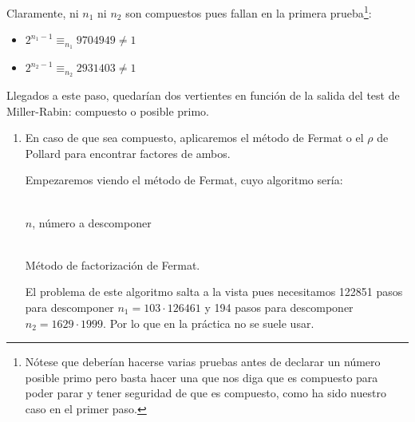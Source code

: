 \begin{enumerate}
		Claramente, ni $n_1$ ni $n_2$ son compuestos pues fallan en la primera prueba\footnote{Nótese que deberían
		hacerse varias pruebas antes de declarar un número posible primo pero basta hacer una que nos diga que es
		compuesto para poder parar y tener seguridad de que es compuesto, como ha sido nuestro caso en el primer
		paso.}:
		\begin{itemize}
			\item $2^{n_1-1} \equiv_{n_1} 9704949 \neq 1$
			\item $2^{n_2-1} \equiv_{n_2} 2931403 \neq 1$
		\end{itemize}
		
		Llegados a este paso, quedarían dos vertientes en función de la salida del test de Miller-Rabin: compuesto
		o posible primo.
		
		\begin{enumerate}
			\item En caso de que sea compuesto, aplicaremos el método de Fermat o el $\rho$ de Pollard para
			encontrar factores de ambos.
			
			Empezaremos viendo el método de Fermat, cuyo algoritmo sería:
			\begin{algorithm}[H]
			\begin{algorithmic}[1]
				\REQUIRE \ \\
					\texttt{$n$}, número a descomponer \\ \
				\ELSE
						\ENDIF
					\ENDWHILE
				\ENDIF
			\end{algorithmic}
			\caption{Método de factorización de Fermat.}
			\label{Fermat-factors}
			\end{algorithm}
			
			El problema de este algoritmo salta a la vista pues necesitamos 122851 pasos para descomponer
			$n_1 = 103 \cdot 126461$ y 194 pasos para descomponer $n_2 = 1629 \cdot 1999$. Por lo que en la
			práctica no se suele usar.
			

\end{enumerate}
\end{enumerate}
